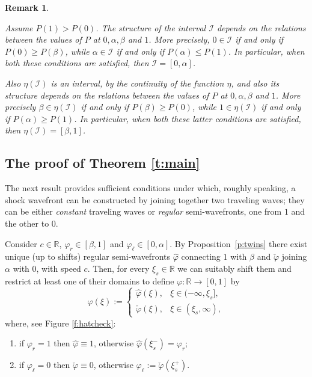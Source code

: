 \documentclass[11pt,a4paper]{article}
\newtheorem{remark}{Remark}[section]
\renewcommand{\phi}{\varphi}
\begin{document}
\begin{remark}\label{r:struttura_I}
{\rm 
Assume $P(1)>P(0)$. The structure of the interval $\mathcal{I}$ depends on the relations between the values of $P$ at $0, \alpha, \beta$ and $1$. More precisely, $0 \in \mathcal{I}$ if and only if $P(0)\ge P(\beta)$, while $\alpha \in \mathcal{I}$ if and only if $P(\alpha)\le P(1)$. In particular, when both these conditions are satisfied,  then $\mathcal{I}=[0, \alpha]$.

\noindent Also $\eta(\mathcal{I})$ is an interval, by the continuity of the function $\eta$, and also its structure depends on the  relations between the values of $P$  at $0, \alpha, \beta$ and $1$. More precisely $\beta \in \eta(\mathcal{I})$ if and only if $P(\beta)\ge P(0)$, while $1 \in \eta(\mathcal{I})$ if and only if $P(\alpha)\ge P(1)$. In particular, when both these latter conditions are satisfied, then $\eta(\mathcal{I})=[\beta, 1]$.
}
\end{remark}
\subsection{The proof of Theorem \ref{t:main}}
\label{sec:suff}

The next result provides sufficient conditions under which, roughly speaking, a shock wavefront can be constructed by joining together two traveling waves; they can be either {\em constant} traveling waves or {\em regular} semi-wavefronts, one from $1$ and the other to $0$. 

Consider $c \in \mathbb R$, $\phi_r\in[\beta,1]$ and $\phi_\ell\in[0,\alpha]$. By Proposition~\ref{p:twins} there exist unique (up to shifts) regular semi-wavefronts $\hat\phi$ connecting $1$ with $\beta$ and $\check\phi$ joining $\alpha$ with $0$, with speed $c$. Then, for every $\xi_s \in \mathbb R$ we can suitably shift them and restrict at least one of their domains to define $\varphi:\mathbb R \to [0,1]$ by
\begin{equation}
\label{e:gluing}
\phi(\xi) := 
\begin{cases}
\hat\phi(\xi), & \xi \in (-\infty, \xi_s], \\%
\check\phi(\xi), & \xi \in (\xi_s, \infty),
\end{cases}
\end{equation}
where, see Figure \ref{f:hatcheck}:
\begin{enumerate}[label=(\roman*)]
\item
if $\phi_r=1$ then $\hat\varphi\equiv 1$, otherwise $\hat\varphi(\xi_s^-)=\varphi_r$;

\item
if $\phi_\ell=0$ then $\check\varphi\equiv 0$, otherwise $\varphi_\ell:= \check\varphi(\xi_s^+)$. 
\end{enumerate}
%
\end{document}
